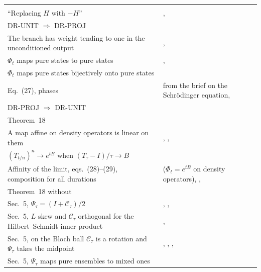 \documentclass[11pt]{article}
\begin{document}
\begin{xltabular}{\textwidth}{@{}BL@{}}
   \\
``Replacing $H$ with $-H$'' & ,  \\
DR-UNIT $\Rightarrow$ DR-PROJ &  \\
The branch has weight tending to one in the unconditioned output &
  ,  \\
$\Phi_t$ maps pure states to pure states & ,
   \\
$\Phi_t$ maps pure states bijectively onto pure states &  \\
Eq.~(27), phases & from the brief on the Schr\"odinger equation,  \\
DR-PROJ $\Rightarrow$ DR-UNIT &  \\
Theorem~18 &  \\
A map affine on density operators is linear on them & ,
  ,  \\
$(T_{t/n})^n \to e^{tB}$ when $(T_\tau - I)/\tau \to B$ &
   \\
Affinity of the limit, eqs.~(28)--(29), composition for all durations &
   ($\Phi_t = e^{tB}$ on density operators),
  ,  \\
Theorem~18 without  &  \\
Sec.~5, $\Psi_\tau = (I + \mathcal{C}_\tau)/2$ &
  , ,
   \\
Sec.~5, $L$ skew and $\mathcal{C}_\tau$ orthogonal for the Hilbert--Schmidt inner product &
  ,  \\
Sec.~5, on the Bloch ball $\mathcal{C}_\tau$ is a rotation and $\Psi_\tau$ takes the midpoint &
  , ,
  ,  \\
Sec.~5, $\Psi_\tau$ maps pure ensembles to mixed ones &

\end{xltabular}
\end{document}

